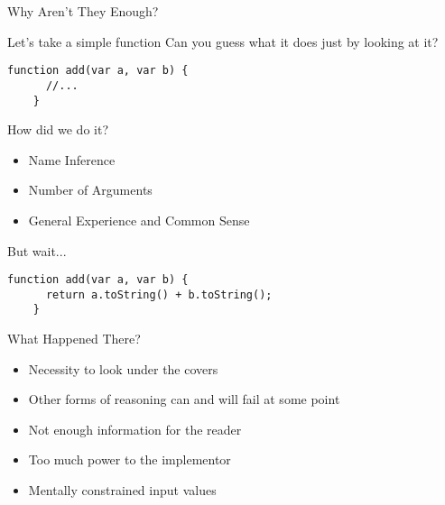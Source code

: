 \begin{section}{Why Aren't They Enough?}

\begin{frame}[fragile]{Let's take a simple function}
  Can you guess what it does just by looking at it?
  \begin{lstlisting}[style=javascript]
    function add(var a, var b) {
      //...
    }
  \end{lstlisting}
\end{frame}

\begin{frame}{How did we do it?}
  \begin{center}
    \begin{itemize}
    \item Name Inference
    \item Number of Arguments
    \item General Experience and Common Sense
    \end{itemize}
\end{center}
\end{frame}

\begin{frame}[fragile]{But wait...}
    \begin{lstlisting}[style=javascript]
    function add(var a, var b) {
      return a.toString() + b.toString();
    }
  \end{lstlisting}
\end{frame}

\begin{frame}{What Happened There?}
  \begin{itemize}
    \item Necessity to look under the covers
    \item Other forms of reasoning can and will fail at some point
    \item Not enough information for the reader
    \item Too much power to the implementor
    \item Mentally constrained input values
  \end{itemize}
\end{frame}

\end{section}
